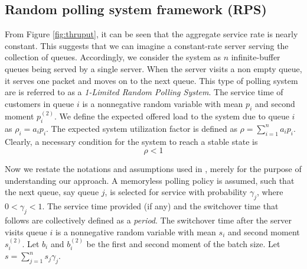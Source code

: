 \documentclass[10pt, conference, compsocconf]{IEEEtran}
\begin{document}
\subsection{Random polling system framework (RPS)}
From Figure \ref{fig:thruput}, it can be seen that the aggregate service rate is nearly constant. This suggests that we can imagine a constant-rate server serving the collection of queues. Accordingly, we consider the system as $n$ infinite-buffer queues being served by a single server. When the server visits a non empty queue, it serves one packet and moves on to the next queue. This type of polling system are is referred to as a \emph{1-Limited Random Polling System}. The service time of customers in queue $i$ is a nonnegative random variable with mean $p_i$ and second moment $p^{(2)}_i$. We define the expected offered load to the system due to queue $i$ as $\rho_i = a_i p_i$. The expected system utilization factor is defined as $\rho = \sum^{n}_{i=1} a_i p_i$. Clearly, a necessary condition for the system to reach a stable state is 
$$\rho < 1$$ 

Now we restate the notations and assumptions used in \cite{lee}, merely for the purpose of understanding our approach. A memoryless polling policy is assumed, such that the next queue, say queue $j$, is selected for service with probability $\gamma_j$, where $0 < \gamma_j < 1$. The service time provided (if any) and the switchover time that follows are collectively defined as a \emph{period}. The switchover time after the server visits queue $i$ is a nonnegative random variable with mean $s_i$ and second moment $s^{(2)}_i$. Let $b_i$ and $b^{(2)}_i$ be the first and second moment of the batch size. Let $s = \sum^{n}_{j=1} s_j \gamma_j$.
\end{document}
